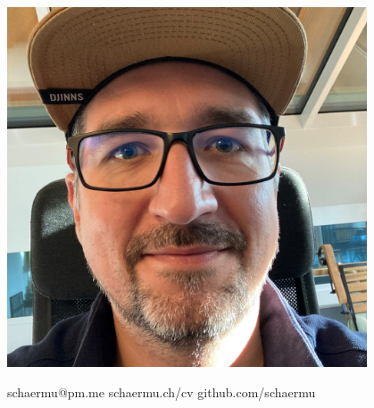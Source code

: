 \documentclass[10pt]{developercv} %
\begin{document}
\begin{minipage}[t]{0.23\textwidth} %
	\vspace{-\baselineskip} %
	\includegraphics[width=0.8\textwidth]{schaermu_quad.jpg}
\end{minipage}
\hfill %

\vspace{0.75cm} %

\begin{minipage}[t]{1\textwidth} %
	\vspace{-\baselineskip} %

	schaermu@pm.me\hspace{0.2cm}
	schaermu.ch/cv\hspace{0.2cm}
	github.com/schaermu\hspace{0.2cm}
\end{minipage}

\vspace{0.5cm} %

\end{document}

